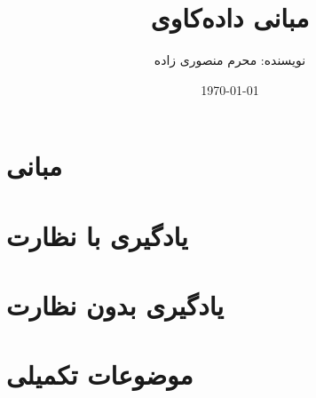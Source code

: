 \documentclass[12pt,oneside]{memoir}
\title{مبانی داده‌کاوی}
\author{نویسنده: محرم منصوری زاده}
\date{\today}
\begin{document}
\frontmatter
\maketitle
 \newpage
\tableofcontents

\mainmatter

\part{مبانی}



\part{یادگیری با نظارت}




\part{یادگیری بدون نظارت}




\part{موضوعات تکمیلی}



\appendix



\backmatter
\printbibliography[title={مراجع}]
\end{document}
